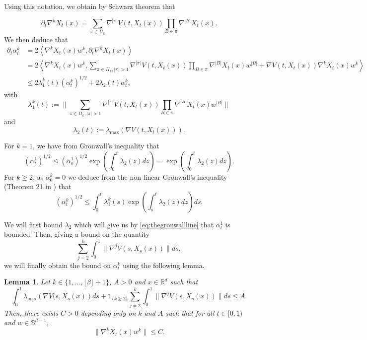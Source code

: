 \documentclass{article}
\newtheorem{lemma}{Lemma}
\begin{document}
Using this notation, we obtain by Schwarz theorem that

$$\partial_t\nabla^k  X_t(x)=\sum_{\pi \in \Pi_k} \nabla^{|\pi|}V(t,X_t(x)) \prod_{B\in \pi} \nabla^{|B|} X_t(x).$$
 We then deduce that
\begin{align*}
    \partial_t \alpha_t^k &= 2\left\langle \nabla^k X_t(x)w^k,\partial_t \nabla^k X_t(x)\right\rangle \\
    &= 2\left\langle \nabla^k X_t(x)w^k, \sum_{\pi \in \Pi_k,|\pi|>1} \nabla^{|\pi|}V(t,X_t(x)) \prod_{B\in \pi} \nabla^{|B|} X_t(x)w^{|B|} + \nabla V(t,X_t(x)) \nabla^k X_t(x)w^k\right\rangle\\
    & \leq 2 \lambda_{1}^k(t)(\alpha_t^k)^{1/2} + 2 \lambda_{2}(t)\alpha_t^k,
\end{align*}
with $$\lambda_{1}^k(t):=\|\sum_{\pi \in \Pi_k,|\pi|>1} \nabla^{|\pi|}V(t,X_t(x)) \prod_{B\in \pi} \nabla^{|B|} X_t(x)w^{|B|} \| $$
and 
$$\lambda_{2}(t):=\lambda_{\max}\left( \nabla V(t,X_t(x))\right).$$

For $k=1$, we have from Gronwall's inequality that
\begin{equation}\label{eq:thegronwallline}
(\alpha_t^1)^{1/2}\leq (\alpha_0^1)^{1/2}\exp\left(\int_0^t \lambda_2(z)dz\right)=\exp\left(\int_0^t \lambda_2(z)dz\right).
\end{equation}
For $k\geq 2$, as $\alpha_0^k=0$ we deduce from the non linear Gronwall's inequality (Theorem 21 in \cite{dragomir2003some}) that 
\begin{equation}\label{eq:thegronwall}
(\alpha_t^k)^{1/2}\leq \int_0^t \lambda_{1}^k(s)\exp\left(\int_s^t \lambda_2(z)dz\right)ds.
\end{equation}

We will first bound $\lambda_2$ which will give us by \eqref{eq:thegronwallline} that $\alpha_t^1$ is bounded. Then, giving a bound on the quantity
$$\sum_{j=2}^k\int_0^1 \|\nabla^j V(s,X_s(x))\|ds,$$
we will finally obtain the bound on $\alpha_t^k$ using the following lemma. 

\begin{lemma}\label{lemma:addlemme} Let $k\in \{1,...,\lfloor \beta \rfloor +1\}$, $A>0$ and $x\in \mathbb{R}^d$ such that
$$
\int_0^1 \lambda_{\max}\left(\nabla V(s,X_s(x)\right)ds+ \mathds{1}_{\{k\geq 2\}}\sum_{j=2}^k\int_0^1 \|\nabla^j V(s,X_s(x))\|ds\leq A.
$$
Then, there exists $C>0$ depending only on $k$ and $A$ such that for all $t\in [0,1)$ and $w\in \mathbb{S}^{d-1}$, 
$$\|\nabla^k X_t(x)w^k\|\leq C.$$
\end{lemma}
\end{document}
